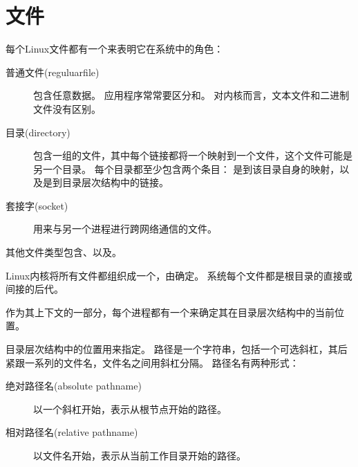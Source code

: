 
\section{文件}
{
    每个Linux文件都有一个来表明它在系统中的角色：

    \begin{description}
        \item[普通文件(reguluarfile)]
        {
            包含任意数据。
            应用程序常常要区分和。
            对内核而言，文本文件和二进制文件没有区别。
        }
        \item[目录(directory)]
        {
            包含一组的文件，其中每个链接都将一个映射到一个文件，这个文件可能是另一个目录。
            每个目录都至少包含两个条目：
            是到该目录自身的映射，以及是到目录层次结构中的链接。
        }
        \item[套接字(socket)] 用来与另一个进程进行跨网络通信的文件。
    \end{description}

    其他文件类型包含、以及。

    Linux内核将所有文件都组织成一个，由确定。
    系统每个文件都是根目录的直接或间接的后代。

    作为其上下文的一部分，每个进程都有一个来确定其在目录层次结构中的当前位置。

    目录层次结构中的位置用来指定。
    路径是一个字符串，包括一个可选斜杠，其后紧跟一系列的文件名，文件名之间用斜杠分隔。
    路径名有两种形式：

    \begin{description}
        \item[绝对路径名(absolute pathname)] 以一个斜杠开始，表示从根节点开始的路径。
        \item[相对路径名(relative pathname)] 以文件名开始，表示从当前工作目录开始的路径。
    \end{description}
}
